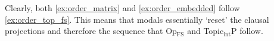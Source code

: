 \documentclass[11pt]{article}
\newcommand{\opfs}{Op\(_{\mathrm{FS}}\)}
\newcommand{\topobj}{Topic\(_{\mathrm{int}}\)P}
\begin{document}
Clearly, both \cref{ex:order_matrix} and \cref{ex:order_embedded} follow \cref{ex:order_top_fs}.
This means that modals essentially `reset' the clausal projections and therefore the sequence that \opfs{} and \topobj{} follow.

%
%
%
%
%
%
%









\end{document}
